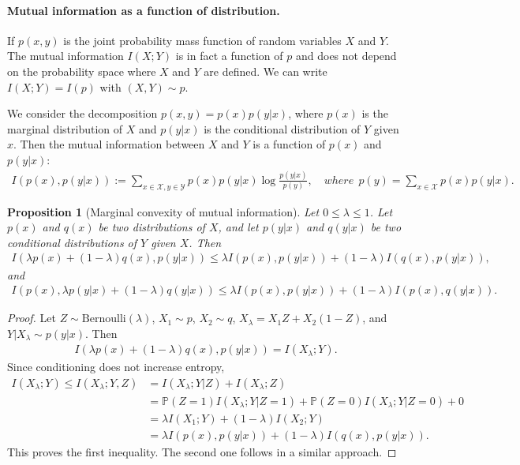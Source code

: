 \documentclass{article}
\numberwithin{equation}{section}
\newcommand{\bbP}{\mathbb{P}}
\renewcommand{\cal}{\mathcal}
\theoremstyle{plain}
\newtheorem{proposition}[theorem]{Proposition}
\theoremstyle{definition}
\begin{document}
\paragraph{Mutual information as a function of distribution.} If $p(x,y)$ is the joint probability mass function of random variables $X$ and $Y$. The mutual information $I(X;Y)$ is in fact a function of $p$ and does not depend on the probability space where $X$ and $Y$ are defined. We can write $I(X;Y)=I(p)$ with $(X,Y)\sim p$.

We consider the decomposition $p(x,y)=p(x)p(y|x)$, where $p(x)$ is the marginal distribution of $X$ and $p(y|x)$ is the conditional distribution of $Y$ given $x$. Then the mutual information between $X$ and $Y$ is a function of $p(x)$ and $p(y|x)$:
\begin{align*}
	I(p(x),p(y|x)):=\sum_{x\in\cal{X},y\in\cal{Y}}p(x)p(y|x)\log\frac{p(y|x)}{p(y)},\quad where\ \ p(y)=\sum_{x\in\cal{X}}p(x)p(y|x).
\end{align*}

\begin{proposition}[Marginal convexity of mutual information] Let $0\leq \lambda\leq 1$. Let $p(x)$ and $q(x)$ be two distributions of $X$, and let $p(y|x)$ and $q(y|x)$ be two conditional distributions of $Y$ given $X$. Then
\begin{align*}
	I(\lambda p(x)+(1-\lambda)q(x),p(y|x))\leq\lambda I(p(x),p(y|x))+(1-\lambda)I(q(x),p(y|x)),
\end{align*}
and
\begin{align*}
	I(p(x),\lambda p(y|x)+(1-\lambda)q(y|x))\leq\lambda I(p(x),p(y|x))+(1-\lambda)I(p(x),q(y|x)).
\end{align*}
\end{proposition}
\begin{proof}
Let $Z\sim\mathrm{Bernoulli}(\lambda)$, $X_1\sim p$, $X_2\sim q$, $X_\lambda=X_1Z+X_2(1-Z)$, and $Y|X_\lambda\sim p(y|x)$. Then
\begin{align*}
	I(\lambda p(x)+(1-\lambda)q(x),p(y|x))=I(X_\lambda;Y).
\end{align*}
Since conditioning does not increase entropy,
\begin{align*}
	I(X_\lambda;Y)\leq I(X_\lambda;Y,Z)&=I(X_\lambda;Y|Z)+I(X_\lambda;Z)\\
	&=\bbP(Z=1)I(X_\lambda;Y|Z=1)+\bbP(Z=0)I(X_\lambda;Y|Z=0)+0\\
	&=\lambda I(X_1;Y)+(1-\lambda)I(X_2;Y)\\
	&=\lambda I(p(x),p(y|x))+(1-\lambda)I(q(x),p(y|x)).
\end{align*}
This proves the first inequality. The second one follows in a similar approach.
\end{proof}
\end{document}
